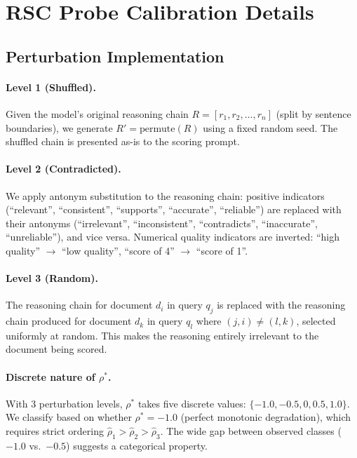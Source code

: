 \documentclass[11pt]{article}
\theoremstyle{definition}
\begin{document}
\section{RSC Probe Calibration Details}
\label{sec:appendix-rsc-details}

\subsection{Perturbation Implementation}

\paragraph{Level 1 (Shuffled).}
Given the model's original reasoning chain \(R = [r_1, r_2, \ldots, r_n]\)
(split by sentence boundaries), we generate \(R' = \text{permute}(R)\)
using a fixed random seed.
The shuffled chain is presented as-is to the scoring prompt.

\paragraph{Level 2 (Contradicted).}
We apply antonym substitution to the reasoning chain:
positive indicators (``relevant'', ``consistent'', ``supports'',
``accurate'', ``reliable'') are replaced with their antonyms
(``irrelevant'', ``inconsistent'', ``contradicts'',
``inaccurate'', ``unreliable''), and vice versa.
Numerical quality indicators are inverted: ``high quality'' \(\to\)
``low quality'', ``score of 4'' \(\to\) ``score of 1''.

\paragraph{Level 3 (Random).}
The reasoning chain for document \(d_i\) in query \(q_j\) is replaced
with the reasoning chain produced for document \(d_k\) in query \(q_l\)
where \((j, i) \neq (l, k)\), selected uniformly at random.
This makes the reasoning entirely irrelevant to the document being scored.

\paragraph{Discrete nature of \(\rho^*\).}
With 3 perturbation levels, \(\rho^*\) takes five discrete values: \(\{-1.0, -0.5, 0, 0.5, 1.0\}\). We classify based on whether \(\rho^* = -1.0\) (perfect monotonic degradation), which requires strict ordering \(\hat{\rho}_1 > \hat{\rho}_2 > \hat{\rho}_3\). The wide gap between observed classes (\(-1.0\) vs.\ \(-0.5\)) suggests a categorical property.
\end{document}
